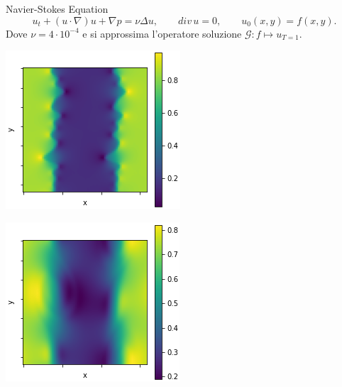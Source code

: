 \documentclass[aspectratio=169]{beamer}
\begin{document}
\begin{frame}[t]{Navier-Stokes Equation}
    \[
    u_{t} + (u \cdot \nabla) u + \nabla p = \nu \Delta u, \qquad div \, u = 0, \quad \quad u_{0}(x, y) = f(x, y).
    \]
    Dove $\nu = 4 \cdot 10^{-4}$ e si approssima l'operatore soluzione $\mathcal{G}: f\mapsto u_{T=1}$.
    \begin{center}
        \begin{minipage}{0.24\textwidth}
            \includegraphics[width=\textwidth]{operators/shearLayer/input.png}
        \end{minipage}
        \hfill
        \begin{minipage}{0.24\textwidth}
            \includegraphics[width=\textwidth]{operators/shearLayer/output.png}

\end{minipage}
\end{center}
\end{frame}
\end{document}
